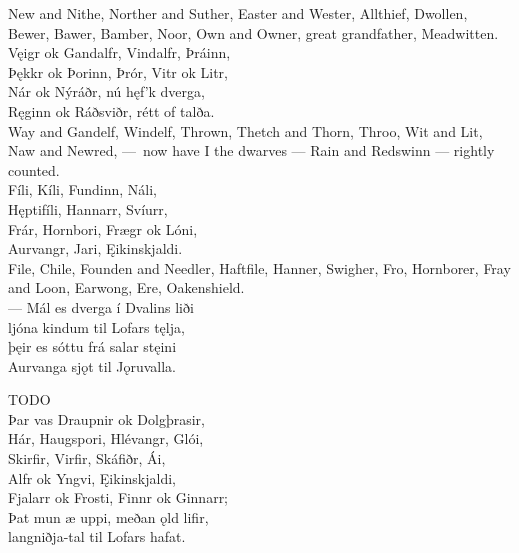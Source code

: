 \bvb New and Nithe, Norther and Suther, Easter and Wester, Allthief, Dwollen, Bewer, Bawer, Bamber, Noor, Own and Owner, great grandfather, Meadwitten.\\%

\bva Vęigr ok Gandalfr, \hld Vindalfr, Þráinn, \\%
Þękkr ok Þorinn, \hld Þrór, Vitr ok Litr, \\%
Nár ok Nýráðr, \hld nú hęf’k dverga, \\%
Ręginn ok Ráðsviðr, \hld rétt of talða.\\%

\bvb Way and Gandelf, Windelf, Thrown, Thetch and Thorn, Throo, Wit and Lit, Naw and Newred, — now have I the dwarves — Rain and Redswinn — rightly counted.\\%

\bva Fíli, Kíli, \hld Fundinn, Náli, \\%
Hęptifíli, \hld Hannarr, Svíurr, \\%
Frár, Hornbori, \hld Frægr ok Lóni, \\%
Aurvangr, Jari, \hld Ęikinskjaldi.\\%

\bvb File, Chile, Founden and Needler, Haftfile, Hanner, Swigher, Fro, Hornborer, Fray and Loon, Earwong, Ere, Oakenshield.\\%

\bva — Mál es dverga \hld í Dvalins liði \\%
ljóna kindum \hld til Lofars tęlja, \\%
þęir es sóttu \hld frá salar stęini \\%
Aurvanga sjǫt \hld til Jǫruvalla.\footnotemark[1]\\%

\bvb TODO\\%

\bva Þar vas Draupnir \hld ok Dolgþrasir, \\%
Hár, Haugspori, \hld Hlévangr, Glói, \\%
Skirfir, Virfir, \hld Skáfiðr, Ái, \\%
Alfr ok Yngvi, \hld Ęikinskjaldi, \\%
Fjalarr ok Frosti, \hld Finnr ok Ginnarr; \\%
Þat mun æ uppi, \hld meðan ǫld lifir, \\%
langniðja-tal \hld til Lofars hafat.\\%

